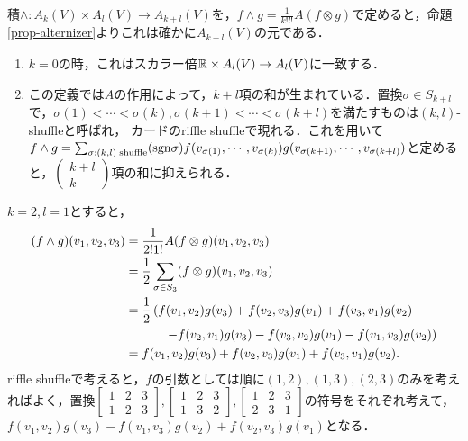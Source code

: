 \documentclass[uplatex,dvipdfmx]{jsreport}
\begin{document}
\begin{screen}
    \begin{definition}
        積$\wedge:A_k(V)\times A_l(V)\to A_{k+l}(V)$を，$f\wedge g=\frac{1}{k!l!}A(f\otimes g)$で定めると，命題\ref{prop-alternizer}よりこれは確かに$A_{k+l}(V)$の元である．
    \end{definition}
\end{screen}
\begin{remark}\mbox{}
    \begin{enumerate}
        \item $k=0$の時，これはスカラー倍$\mathbb{R}\times A_l(V)\to A_l(V)$に一致する．
        \item この定義では$A$の作用によって，$k+l$項の和が生まれている．置換$\sigma\in S_{k+l}$で，$\sigma(1)<\cdots<\sigma(k),\sigma(k+1)<\cdots<\sigma(k+l)$を満たすものは$(k,l)$-shuffleと呼ばれ，
        カードのriffle shuffleで現れる．これを用いて$f\wedge g=\sum_{\sigma:(k,l)\;\mathrm{shuffle}}(\mathrm{sgn}\sigma)f(v_{\sigma(1)},\cdots,v_{\sigma(k)})g(v_{\sigma(k+1)},\cdots,v_{\sigma(k+l)})$と定めると，$\begin{pmatrix}k+l\\k\end{pmatrix}$項の和に抑えられる．
    \end{enumerate}
\end{remark}

\begin{example}
    $k=2,l=1$とすると，
    \begin{align*}
        (f\wedge g)(v_1,v_2,v_3)&=\frac{1}{2!1!}A(f\otimes g)(v_1,v_2,v_3)\\
        &=\frac{1}{2}\sum_{\sigma\in S_3}(f\otimes g)(v_1,v_2,v_3)\\
        &=\frac{1}{2}\left(f(v_1,v_2)g(v_3)+f(v_2,v_3)g(v_1)+f(v_3,v_1)g(v_2)\right.\\
        &\hphantom{====}\left. -f(v_2,v_1)g(v_3)-f(v_3,v_2)g(v_1)-f(v_1,v_3)g(v_2)\right)\\
        &=f(v_1,v_2)g(v_3)+f(v_2,v_3)g(v_1)+f(v_3,v_1)g(v_2).
    \end{align*}
    riffle shuffleで考えると，$f$の引数としては順に$(1,2),(1,3),(2,3)$のみを考えればよく，置換$\begin{bmatrix}1&2&3\\1&2&3\end{bmatrix},\begin{bmatrix}1&2&3\\1&3&2\end{bmatrix},\begin{bmatrix}1&2&3\\2&3&1\end{bmatrix}$の符号をそれぞれ考えて，
    $f(v_1,v_2)g(v_3)-f(v_1,v_3)g(v_2)+f(v_2,v_3)g(v_1)$となる．
\end{example}
\end{document}
